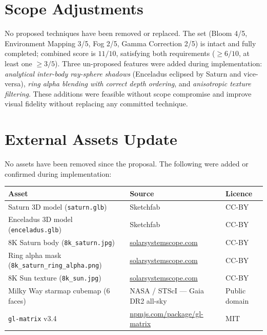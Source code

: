 \documentclass[11pt,a4paper]{article}
\begin{document}
\section{Scope Adjustments}

No proposed techniques have been removed or replaced.
The set (Bloom 4/5, Environment Mapping 3/5, Fog 2/5, Gamma Correction 2/5)
is intact and fully completed; combined score is $11/10$, satisfying both
requirements ($\geq 6/10$, at least one $\geq 3/5$).
Three un-proposed features were added during implementation:
\textit{analytical inter-body ray-sphere shadows}
(Enceladus eclipsed by Saturn and vice-versa),
\textit{ring alpha blending with correct depth ordering}, and
\textit{anisotropic texture filtering}.
These additions were feasible without scope compromise and improve visual
fidelity without replacing any committed technique.

\section{External Assets Update}

No assets have been removed since the proposal.
The following were added or confirmed during implementation:

\smallskip
\begin{tabular}{@{}p{4.6cm}p{5.8cm}p{4.4cm}@{}}
\toprule
Asset & Source & Licence \\
\midrule
Saturn 3D model (\texttt{saturn.glb})
  & Sketchfab & CC-BY \\
Enceladus 3D model (\texttt{enceladus.glb})
  & Sketchfab & CC-BY \\
8K Saturn body (\texttt{8k\_saturn.jpg})
  & \href{https://www.solarsystemscope.com/textures/}{solarsystemscope.com}
  & CC-BY \\
Ring alpha mask (\texttt{8k\_saturn\_ring\_alpha.png})
  & \href{https://www.solarsystemscope.com/textures/}{solarsystemscope.com}
  & CC-BY \\
8K Sun texture (\texttt{8k\_sun.jpg})
  & \href{https://www.solarsystemscope.com/textures/}{solarsystemscope.com}
  & CC-BY \\
Milky Way starmap cubemap (6 faces)
  & NASA / STScI --- Gaia DR2 all-sky
  & Public domain \\
\texttt{gl-matrix} v3.4
  & \href{https://npmjs.com/package/gl-matrix}{npmjs.com/package/gl-matrix}
  & MIT \\
\bottomrule
\end{tabular}
\end{document}
